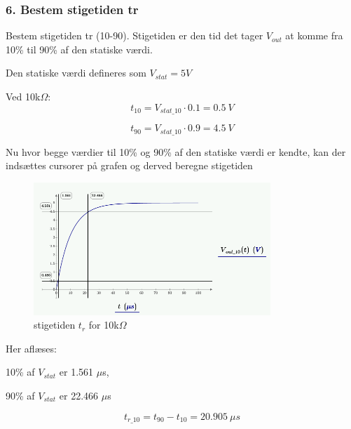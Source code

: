 \subsubsection*{6. Bestem stigetiden tr}
Bestem stigetiden tr (10-90).
Stigetiden er den tid det tager $V_{out}$ at komme fra 10\%  til 90\% af den statiske værdi.

Den statiske værdi defineres som $V_{stat} = 5 V$

Ved 10k$\Omega$:
\begin{equation}
	t_{10} = V_{stat\_10}\cdot 0.1 = 0.5\ V
	\label{t_10K_10}
\end{equation}

\begin{equation}
	t_{90} = V_{stat\_10}\cdot 0.9 = 4.5\ V
	\label{t_10K_90}
\end{equation}

Nu hvor begge værdier til 10\% og 90\% af den statiske værdi er kendte, kan der indsættes cursorer på grafen og derved beregne stigetiden

\begin{figure}[h]
 \begin{center}
  \includegraphics[height=5cm]{P_Fig/figur18_anast10K}
  \caption{stigetiden $t_r$ for 10k$\Omega$}
  \label{st10K}
 \end{center}
\end{figure}

Her aflæses:
\begin{center}
\begin{minipage}{.2\linewidth}
10\% af $V_{stat}$ er 1.561 $\mu$s,
\end{minipage} 
\begin{minipage}{.2\linewidth}
90\% af $V_{stat}$ er 22.466 $\mu$s
\end{minipage} 
\end{center}

\begin{equation}
	t_{r\_10} = t_{90}-t_{10} = 20.905\ \mu s
\end{equation}

